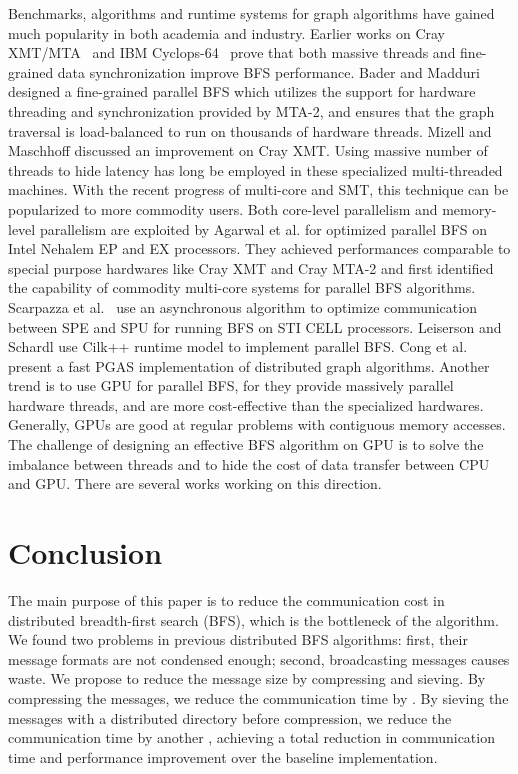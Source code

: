\documentclass[conference]{IEEEtran}
\begin{document}
Benchmarks, algorithms and runtime systems for graph algorithms have gained
much popularity in both academia and industry.  Earlier works on Cray
XMT/MTA~\cite{Bader:2006:MTA,Mizell:2009} and IBM
Cyclops-64~\cite{tan-cyclops64} prove that both massive threads and
fine-grained data synchronization improve BFS performance.  Bader and Madduri
\cite{Bader:2006:MTA} designed a fine-grained parallel BFS which utilizes the
support for hardware threading and synchronization provided by MTA-2, and
ensures that the graph traversal is load-balanced to run on thousands of
hardware threads. Mizell and Maschhoff \cite{Mizell:2009} discussed an
improvement on Cray XMT. Using massive number of threads to hide latency has
long be employed in these specialized multi-threaded machines. With the recent
progress of multi-core and SMT, this technique can be popularized to more
commodity users. Both core-level parallelism and memory-level parallelism are
exploited by Agarwal et al. \cite{Agarwal:2010} for optimized parallel BFS on
Intel Nehalem EP and EX processors. They achieved performances comparable to
special purpose hardwares like Cray XMT and Cray MTA-2 and first identified
the capability of commodity multi-core systems for parallel BFS algorithms.
Scarpazza et al.~\cite{Scarpazza:Cell} use an asynchronous algorithm to
optimize communication between SPE and SPU for running BFS on STI CELL
processors.  Leiserson and Schardl \cite{Leiserson:2010} use Cilk++ runtime
model to implement parallel BFS. Cong et al.~\cite{Cong:2010} present a fast
PGAS implementation of distributed graph algorithms. Another trend is to use
GPU for parallel BFS, for they provide massively parallel hardware threads,
and are more cost-effective than the specialized hardwares.  Generally, GPUs
are good at regular problems with contiguous memory accesses. The challenge of
designing an effective BFS algorithm on GPU is to solve the imbalance between
threads and to hide the cost of data transfer between CPU and GPU.  There are
several works \cite{Hong:2011,Harish-cuda,Luo:2010} working on this direction.





\section{Conclusion}
\label{sec:cls}

The main purpose of this paper is to reduce the communication cost in
distributed breadth-first search (BFS), which is the bottleneck of the
algorithm. We found two problems in previous distributed BFS algorithms:
first, their message formats are not condensed enough; second, broadcasting
messages causes waste.  We propose to reduce the message size by compressing
and sieving.  By compressing the messages, we reduce the communication time by
.  By sieving the messages with a distributed directory before
compression, we reduce the communication time by another , achieving a
total  reduction in communication time and  performance
improvement over the baseline implementation.
\end{document}
